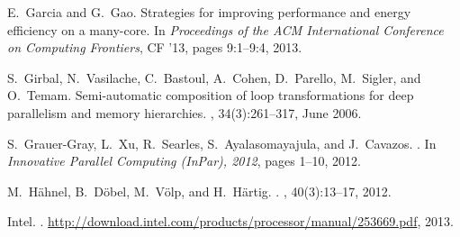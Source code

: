 \documentclass{sig-alternate}
\begin{document}
\begin{thebibliography}{10}
E.~Garcia and G.~Gao.                                                            
\newblock Strategies for improving performance and energy efficiency on a        
  many-core.                                                                     
\newblock In {\em Proceedings of the ACM International Conference on Computing   
  Frontiers}, CF '13, pages 9:1--9:4, 2013.     

S.~Girbal, N.~Vasilache, C.~Bastoul, A.~Cohen, D.~Parello, M.~Sigler, and        
  O.~Temam.                                                                      
\newblock Semi-automatic composition of loop transformations for deep            
  parallelism and memory hierarchies.                                            
, 34(3):261--317, June 2006.            
                                                                                 
S.~Grauer-Gray, L.~Xu, R.~Searles, S.~Ayalasomayajula, and J.~Cavazos.           
.             
\newblock In {\em Innovative Parallel Computing (InPar), 2012}, pages 1--10,     
  2012.                                                                          
                                                                                 
M.~H\"{a}hnel, B.~D\"{o}bel, M.~V\"{o}lp, and H.~H\"{a}rtig.                     
.        
, 40(3):13--17, 2012.              
                                                                                 
{Intel}.                                                                         
.                                                                     
\newblock \url{http://download.intel.com/products/processor/manual/253669.pdf},  
  2013.                                                                          
                                                                                 

\end{thebibliography}
\end{document}
